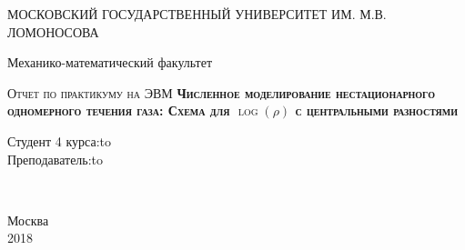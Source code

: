 \documentclass[12pt]{extarticle}
\numberwithin{equation}{section}
\begin{document}
\begin{titlepage} \newpage 
\begin{center} МОСКОВСКИЙ ГОСУДАРСТВЕННЫЙ УНИВЕРСИТЕТ ИМ. М.В. ЛОМОНОСОВА\end{center} 
\vspace{8em} \begin{center} 
\Large Механико-математический факультет \\ \end{center}
\vspace{2em} \begin{center} 
\textsc{Отчет по практикуму на ЭВМ \linebreak 
\textbf{Численное моделирование нестационарного одномерного течения газа: \linebreak
Схема для $\log (\rho)$ с центральными разностями}} \end{center}
\vspace{6em} \newbox{\lbox}  
\newlength{\maxl} \setlength{\maxl}{\wd\lbox} \hfill\parbox{12	cm}
{ \hspace*{10cm}\hspace*{-5cm}Студент 4 курса:\hfill\hbox to\\
\hspace*{10cm}\hspace*{-5cm}Преподаватель:\hfill\hbox to}\\  \vspace{\fill}
\begin{center} Москва \\ 2018\end{center} \end{titlepage}


\tableofcontents
\renewcommand{\figurename}{График}
\renewcommand{\theequation}{\thesection.\arabic{equation}}


\newpage



%


%
\end{document}
